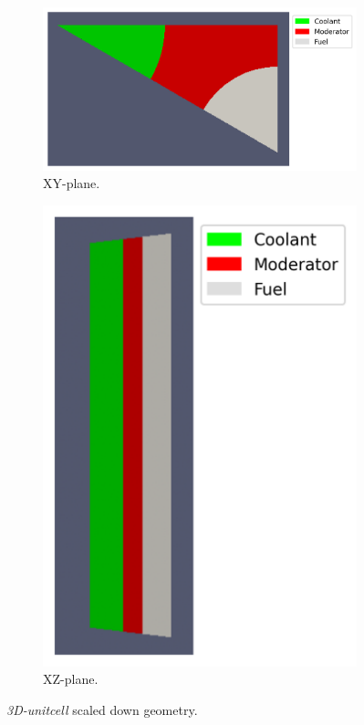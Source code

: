 \documentclass[11pt,letterpaper]{article}
\begin{document}
	\begin{figure}[htbp!]
		\centering
		\begin{subfigure}[t]{0.4\textwidth}
			\centering
			\includegraphics[width=\linewidth]{3D-unitcell-mesh1B}
			\caption{XY-plane.}
		\end{subfigure}
		\begin{subfigure}[t]{0.4\textwidth}
			\centering
			\includegraphics[width=\linewidth]{3D-unitcell-mesh2B}
			\caption{XZ-plane.}
		\end{subfigure}
		\hfill
		\caption{\textit{3D-unitcell} scaled down geometry.}
		\label{fig:3D-unitcell}
	\end{figure}
\end{document}
